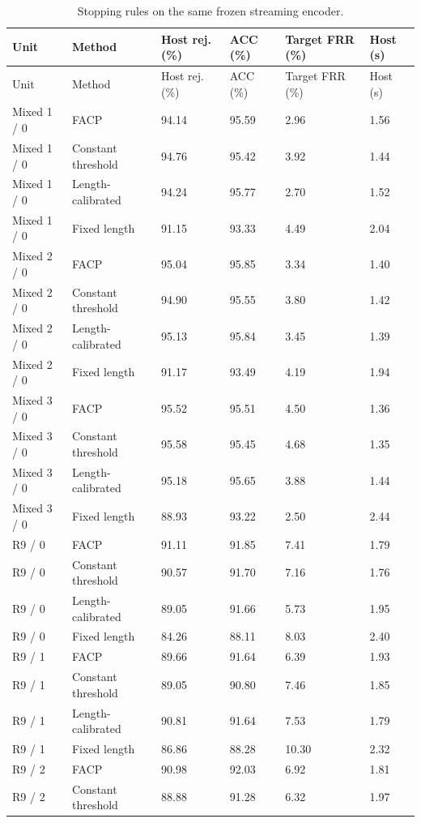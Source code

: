 \begin{longtable}{llllll}
\caption{Stopping rules on the same frozen streaming encoder.}\label{tab:s_stopping}\\
\toprule
Unit & Method & Host rej. (\%) & ACC (\%) & Target FRR (\%) & Host (s)\\\midrule\endfirsthead
\toprule
Unit & Method & Host rej. (\%) & ACC (\%) & Target FRR (\%) & Host (s)\\\midrule\endhead
\bottomrule\endfoot
Mixed 1 / 0 & FACP & 94.14 & 95.59 & 2.96 & 1.56\\
Mixed 1 / 0 & Constant threshold & 94.76 & 95.42 & 3.92 & 1.44\\
Mixed 1 / 0 & Length-calibrated & 94.24 & 95.77 & 2.70 & 1.52\\
Mixed 1 / 0 & Fixed length & 91.15 & 93.33 & 4.49 & 2.04\\
Mixed 2 / 0 & FACP & 95.04 & 95.85 & 3.34 & 1.40\\
Mixed 2 / 0 & Constant threshold & 94.90 & 95.55 & 3.80 & 1.42\\
Mixed 2 / 0 & Length-calibrated & 95.13 & 95.84 & 3.45 & 1.39\\
Mixed 2 / 0 & Fixed length & 91.17 & 93.49 & 4.19 & 1.94\\
Mixed 3 / 0 & FACP & 95.52 & 95.51 & 4.50 & 1.36\\
Mixed 3 / 0 & Constant threshold & 95.58 & 95.45 & 4.68 & 1.35\\
Mixed 3 / 0 & Length-calibrated & 95.18 & 95.65 & 3.88 & 1.44\\
Mixed 3 / 0 & Fixed length & 88.93 & 93.22 & 2.50 & 2.44\\
R9 / 0 & FACP & 91.11 & 91.85 & 7.41 & 1.79\\
R9 / 0 & Constant threshold & 90.57 & 91.70 & 7.16 & 1.76\\
R9 / 0 & Length-calibrated & 89.05 & 91.66 & 5.73 & 1.95\\
R9 / 0 & Fixed length & 84.26 & 88.11 & 8.03 & 2.40\\
R9 / 1 & FACP & 89.66 & 91.64 & 6.39 & 1.93\\
R9 / 1 & Constant threshold & 89.05 & 90.80 & 7.46 & 1.85\\
R9 / 1 & Length-calibrated & 90.81 & 91.64 & 7.53 & 1.79\\
R9 / 1 & Fixed length & 86.86 & 88.28 & 10.30 & 2.32\\
R9 / 2 & FACP & 90.98 & 92.03 & 6.92 & 1.81\\
R9 / 2 & Constant threshold & 88.88 & 91.28 & 6.32 & 1.97\\

\end{longtable}
